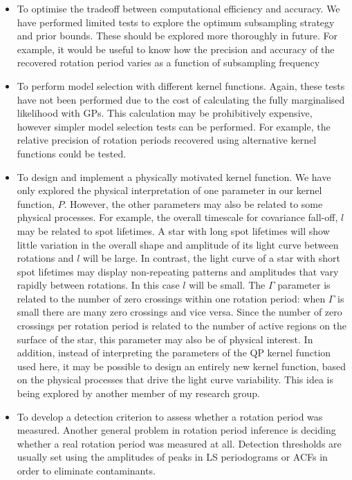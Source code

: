 \begin{itemize}
\item{To optimise the tradeoff between computational efficiency and accuracy.
We have performed limited tests to explore the optimum subsampling strategy
and prior bounds.
These should be explored more thoroughly in future.
For example, it would be useful to know how the precision and accuracy of the
recovered rotation period varies as a function of subsampling frequency}
\item{To perform model selection with different kernel functions. Again, these
tests have not been performed due to the cost of calculating the fully
marginalised likelihood with GPs. This calculation may be prohibitively
expensive, however simpler model selection tests can be performed. For
example, the relative precision of rotation periods recovered using
alternative kernel functions could be tested.}
\item{To design and implement a physically motivated kernel function. We have
only explored the physical interpretation of one parameter in our kernel
function, $P$.
However, the other parameters may also be related to some physical processes.
For example, the overall timescale for covariance fall-off, $l$ may be
related to spot lifetimes.
A star with long spot lifetimes will show little variation in the overall
shape and amplitude of its light curve between rotations and $l$ will be
large.
In contrast, the light curve of a star with short spot lifetimes may display
non-repeating patterns and amplitudes that vary rapidly between rotations.
In this case $l$ will be small.
The $\Gamma$ parameter is related to the number of zero crossings within one
rotation period: when $\Gamma$ is small there are many zero crossings and
vice versa.
Since the number of zero crossings per rotation period is related to the
number of active regions on the surface of the star, this parameter may also
be of physical interest.
In addition, instead of interpreting the parameters of the QP kernel function
used here, it may be possible to design an entirely new kernel function, based
on the physical processes that drive the light curve variability.
This idea is being explored by another member of my research group.}
\item{To develop a detection criterion to assess whether a rotation period was
measured.
Another general problem in rotation period inference is deciding whether a
real rotation period was measured at all.
Detection thresholds are usually set using the amplitudes of peaks in LS
periodograms or ACFs in order to eliminate contaminants.
}
\end{itemize}
